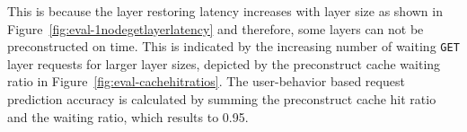 This is because the layer restoring latency increases with layer size as shown in
Figure~\ref{fig:eval-1nodegetlayerlatency} and therefore, some layers can not be preconstructed
on time.
%
%
This is indicated by the increasing number of waiting \texttt{GET} layer requests for larger layer
sizes, depicted by the preconstruct cache waiting ratio in Figure~\ref{fig:eval-cachehitratios}.
%
%
The user-behavior based request prediction accuracy is calculated by summing the preconstruct
cache hit ratio and the waiting ratio, which results to 0.95.
%

